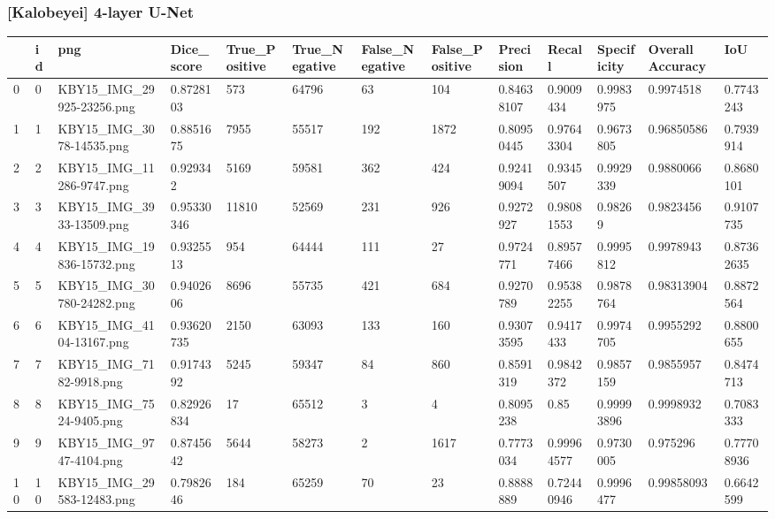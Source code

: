 \documentclass[11pt, a4paper, twoside]{report}
\begin{document}
\subsubsection{[Kalobeyei] 4-layer U-Net}

\begin{longtable}[c]{@{}lllllllllllll@{}}
\toprule
 & id & png & Dice\_score & True\_Positive & True\_Negative & False\_Negative & False\_Positive & Precision & Recall & Specificity & Overall Accuracy & IoU \\* \midrule
\endhead
%
\bottomrule
\endfoot
%
\endlastfoot
%
0 & 0 & KBY15\_IMG\_29925-23256.png & 0.8728103 & 573 & 64796 & 63 & 104 & 0.84638107 & 0.9009434 & 0.9983975 & 0.9974518 & 0.7743243 \\
1 & 1 & KBY15\_IMG\_3078-14535.png & 0.8851675 & 7955 & 55517 & 192 & 1872 & 0.80950445 & 0.97643304 & 0.9673805 & 0.96850586 & 0.7939914 \\
2 & 2 & KBY15\_IMG\_11286-9747.png & 0.929342 & 5169 & 59581 & 362 & 424 & 0.92419094 & 0.9345507 & 0.9929339 & 0.9880066 & 0.8680101 \\
3 & 3 & KBY15\_IMG\_3933-13509.png & 0.95330346 & 11810 & 52569 & 231 & 926 & 0.9272927 & 0.98081553 & 0.98269 & 0.9823456 & 0.9107735 \\
4 & 4 & KBY15\_IMG\_19836-15732.png & 0.9325513 & 954 & 64444 & 111 & 27 & 0.9724771 & 0.89577466 & 0.9995812 & 0.9978943 & 0.87362635 \\
5 & 5 & KBY15\_IMG\_30780-24282.png & 0.9402606 & 8696 & 55735 & 421 & 684 & 0.9270789 & 0.95382255 & 0.9878764 & 0.98313904 & 0.8872564 \\
6 & 6 & KBY15\_IMG\_4104-13167.png & 0.93620735 & 2150 & 63093 & 133 & 160 & 0.93073595 & 0.9417433 & 0.9974705 & 0.9955292 & 0.8800655 \\
7 & 7 & KBY15\_IMG\_7182-9918.png & 0.9174392 & 5245 & 59347 & 84 & 860 & 0.8591319 & 0.9842372 & 0.9857159 & 0.9855957 & 0.8474713 \\
8 & 8 & KBY15\_IMG\_7524-9405.png & 0.82926834 & 17 & 65512 & 3 & 4 & 0.8095238 & 0.85 & 0.99993896 & 0.9998932 & 0.7083333 \\
9 & 9 & KBY15\_IMG\_9747-4104.png & 0.8745642 & 5644 & 58273 & 2 & 1617 & 0.7773034 & 0.99964577 & 0.9730005 & 0.975296 & 0.77708936 \\
10 & 10 & KBY15\_IMG\_29583-12483.png & 0.7982646 & 184 & 65259 & 70 & 23 & 0.8888889 & 0.72440946 & 0.9996477 & 0.99858093 & 0.6642599 \\

\end{longtable}
\end{document}
